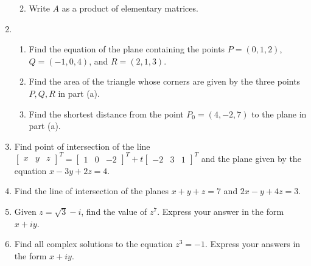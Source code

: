 \documentclass[12pt]{article}
\newcommand{\points}[1]{\marginpar{\hspace{24pt}[#1]}}
\begin{document}
\begin{enumerate}
\begin{enumerate}
\vspace{1.75in}

 \item Write $A$ as a product of elementary matrices. \points{2}
\end{enumerate}
\newpage

\item \begin{enumerate}
       \item Find the equation of the plane containing the points $P=(0,1,2)$, $Q=(-1,0,4)$, and $R=(2,1,3)$.\points{5}

\vspace{3in}

 \item Find the area of the triangle whose corners are given by the three points $P,Q,R$ in part (a). \points{2}

\vspace{2in}

 \item Find the shortest distance from the point $P_0 = (4,-2,7)$ to the plane in part (a). \points{3}
      \end{enumerate}
\newpage

\item Find point of intersection of the line $\begin{bmatrix}x&y&z\end{bmatrix}^T = \begin{bmatrix}1&0&-2\end{bmatrix}^T+t\begin{bmatrix}-2&3&1\end{bmatrix}^T$ and the plane given by the equation $x-3y+2z=4$. \points{5}

\vspace{4in}

\item Find the line of intersection of the planes $x+y+z=7$ and $2x-y+4z=3$. \points{5}

\newpage

\item Given $z=\sqrt{3}-i$, find the value of $z^7$. Express your answer in the form $x+iy$. \points{4}

\vspace{4in}

\item Find all complex solutions to the equation $z^3=-1$. \points{4} Express your answers in the form $x+iy$.

\newpage


\end{enumerate}
\end{document}
